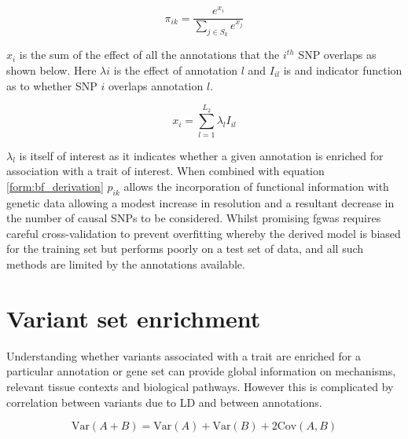\documentclass[a4paper,11pt]{report}
\begin{document}
\begin{equation}
	\pi_{ik} = \frac{e^{x_{i}}}{\sum_{j \in S_k}e^{x_{j}}}
\end{equation}

$x_i$ is the sum of the effect of all the annotations that the $i^{th}$ SNP overlaps as shown below.  Here $\lambda{i}$ is the effect of annotation $l$ and $I_{il}$ is and indicator function as to whether SNP $i$ overlaps annotation $l$.  

\begin{equation}
	x_{i} = \sum_{l=1}^{L_{2}} \lambda_{l}I_{il}
\end{equation}

$\lambda_{l}$ is itself of interest as it indicates whether a given annotation is enriched for association with a trait of interest. When combined with equation \ref{form:bf_derivation} $p_{ik}$ allows the incorporation of functional information with genetic data allowing a modest increase in resolution and a resultant decrease in the number of causal SNPs to be considered. Whilst promising fgwas requires careful cross-validation to prevent overfitting whereby the derived model is biased for the training set but performs poorly on a test set of data, and all such methods are limited by the annotations available.  

\section{Variant set enrichment}
Understanding whether variants associated with a trait are enriched for a particular annotation or gene set can provide global information on mechanisms, relevant tissue contexts and biological pathways. However this is complicated by correlation between variants due to LD and between annotations. 

\begin{equation}
	\text{Var}(A + B) = \text{Var}(A) + \text{Var}(B) + 2\text{Cov}(A,B)
\end{equation}
\end{document}
